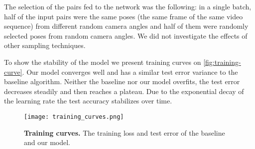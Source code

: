 \documentclass[preprint]{elsarticle}
\begin{document}
The selection of the pairs fed to the network was the following: in a single batch, half of the input pairs were the same poses (the same frame of the same video sequence) from different random camera angles and half of them were randomly selected poses from random camera angles. We did not investigate the effects of other sampling techniques.

To show the stability of the model we present training curves on \autoref{fig:training-curve}. Our model converges well and has a similar test error variance to the baseline algorithm. Neither the baseline nor our model overfits, the test error decreases steadily and then reaches a  plateau. Due to the exponential decay of the learning rate the test accuracy stabilizes over time.

\begin{figure}[ht]
    \centering
    \texttt{[image: training\_curves.png]}
    \caption{\textbf{Training curves.} The training loss and test error of the baseline and our model.}
    \label{fig:training-curve}
\end{figure}
\end{document}

